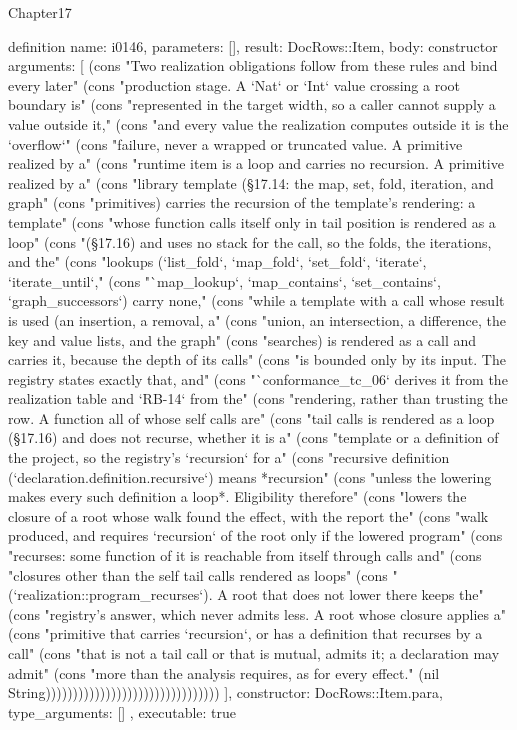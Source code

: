 \begin{lexlean}{Chapter17}
\begin{semanticmodule}
definition{
  name: i0146,
  parameters: [],
  result: DocRows::Item,
  body: constructor{
    arguments: [
      (cons "Two realization obligations follow from these rules and bind every later" (cons "production stage. A `Nat` or `Int` value crossing a root boundary is" (cons "represented in the target width, so a caller cannot supply a value outside it," (cons "and every value the realization computes outside it is the `overflow`" (cons "failure, never a wrapped or truncated value. A primitive realized by a" (cons "runtime item is a loop and carries no recursion. A primitive realized by a" (cons "library template (§17.14: the map, set, fold, iteration, and graph" (cons "primitives) carries the recursion of the template's rendering: a template" (cons "whose function calls itself only in tail position is rendered as a loop" (cons "(§17.16) and uses no stack for the call, so the folds, the iterations, and the" (cons "lookups (`list_fold`, `map_fold`, `set_fold`, `iterate`, `iterate_until`," (cons "`map_lookup`, `map_contains`, `set_contains`, `graph_successors`) carry none," (cons "while a template with a call whose result is used (an insertion, a removal, a" (cons "union, an intersection, a difference, the key and value lists, and the graph" (cons "searches) is rendered as a call and carries it, because the depth of its calls" (cons "is bounded only by its input. The registry states exactly that, and" (cons "`conformance_tc_06` derives it from the realization table and `RB-14` from the" (cons "rendering, rather than trusting the row. A function all of whose self calls are" (cons "tail calls is rendered as a loop (§17.16) and does not recurse, whether it is a" (cons "template or a definition of the project, so the registry's `recursion` for a" (cons "recursive definition (`declaration.definition.recursive`) means *recursion" (cons "unless the lowering makes every such definition a loop*. Eligibility therefore" (cons "lowers the closure of a root whose walk found the effect, with the report the" (cons "walk produced, and requires `recursion` of the root only if the lowered program" (cons "recurses: some function of it is reachable from itself through calls and" (cons "closures other than the self tail calls rendered as loops" (cons "(`realization::program_recurses`). A root that does not lower there keeps the" (cons "registry's answer, which never admits less. A root whose closure applies a" (cons "primitive that carries `recursion`, or has a definition that recurses by a call" (cons "that is not a tail call or that is mutual, admits it; a declaration may admit" (cons "more than the analysis requires, as for every effect." (nil String))))))))))))))))))))))))))))))))
    ],
    constructor: DocRows::Item.para,
    type_arguments: []
  },
  executable: true
}


\end{semanticmodule}
\end{lexlean}
